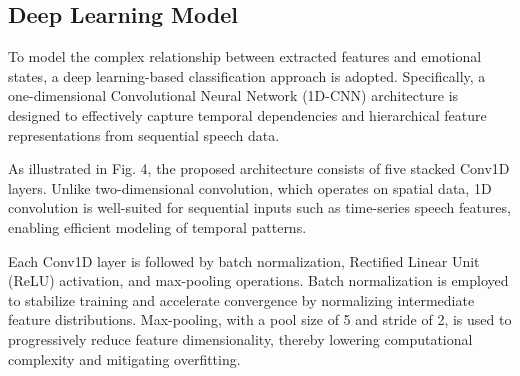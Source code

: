 \documentclass[iicol,sn-mathphys-num]{sn-jnl}%
\theoremstyle{thmstyleone}%
\theoremstyle{thmstyletwo}%
\theoremstyle{thmstylethree}%
\begin{document}

\subsection{Deep Learning Model}\label{subsec3.4}

To model the complex relationship between extracted features and emotional states, a deep learning-based classification approach is adopted. Specifically, a one-dimensional Convolutional Neural Network (1D-CNN) architecture is designed to effectively capture temporal dependencies and hierarchical feature representations from sequential speech data.

As illustrated in Fig. 4, the proposed architecture consists of five stacked Conv1D layers. Unlike two-dimensional convolution, which operates on spatial data, 1D convolution is well-suited for sequential inputs such as time-series speech features, enabling efficient modeling of temporal patterns.

Each Conv1D layer is followed by batch normalization, Rectified Linear Unit (ReLU) activation, and max-pooling operations. Batch normalization is employed to stabilize training and accelerate convergence by normalizing intermediate feature distributions. Max-pooling, with a pool size of 5 and stride of 2, is used to progressively reduce feature dimensionality, thereby lowering computational complexity and mitigating overfitting.
\end{document}

